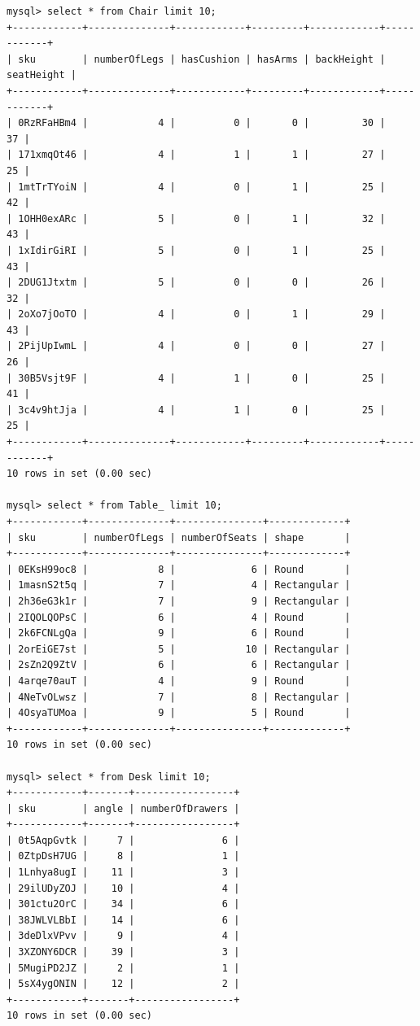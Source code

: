 \documentclass[american,extrafontsizes,12pt,portrait,letterpaper,oneside,onecolumn,final]{memoir}
\begin{document}
\begin{verbatim}
mysql> select * from Chair limit 10;
+------------+--------------+------------+---------+------------+------------+
| sku        | numberOfLegs | hasCushion | hasArms | backHeight | seatHeight |
+------------+--------------+------------+---------+------------+------------+
| 0RzRFaHBm4 |            4 |          0 |       0 |         30 |         37 |
| 171xmqOt46 |            4 |          1 |       1 |         27 |         25 |
| 1mtTrTYoiN |            4 |          0 |       1 |         25 |         42 |
| 1OHH0exARc |            5 |          0 |       1 |         32 |         43 |
| 1xIdirGiRI |            5 |          0 |       1 |         25 |         43 |
| 2DUG1Jtxtm |            5 |          0 |       0 |         26 |         32 |
| 2oXo7jOoTO |            4 |          0 |       1 |         29 |         43 |
| 2PijUpIwmL |            4 |          0 |       0 |         27 |         26 |
| 30B5Vsjt9F |            4 |          1 |       0 |         25 |         41 |
| 3c4v9htJja |            4 |          1 |       0 |         25 |         25 |
+------------+--------------+------------+---------+------------+------------+
10 rows in set (0.00 sec)

mysql> select * from Table_ limit 10;
+------------+--------------+---------------+-------------+
| sku        | numberOfLegs | numberOfSeats | shape       |
+------------+--------------+---------------+-------------+
| 0EKsH99oc8 |            8 |             6 | Round       |
| 1masnS2t5q |            7 |             4 | Rectangular |
| 2h36eG3k1r |            7 |             9 | Rectangular |
| 2IQOLQOPsC |            6 |             4 | Round       |
| 2k6FCNLgQa |            9 |             6 | Round       |
| 2orEiGE7st |            5 |            10 | Rectangular |
| 2sZn2Q9ZtV |            6 |             6 | Rectangular |
| 4arqe70auT |            4 |             9 | Round       |
| 4NeTvOLwsz |            7 |             8 | Rectangular |
| 4OsyaTUMoa |            9 |             5 | Round       |
+------------+--------------+---------------+-------------+
10 rows in set (0.00 sec)

mysql> select * from Desk limit 10;
+------------+-------+-----------------+
| sku        | angle | numberOfDrawers |
+------------+-------+-----------------+
| 0t5AqpGvtk |     7 |               6 |
| 0ZtpDsH7UG |     8 |               1 |
| 1Lnhya8ugI |    11 |               3 |
| 29ilUDyZOJ |    10 |               4 |
| 301ctu2OrC |    34 |               6 |
| 38JWLVLBbI |    14 |               6 |
| 3deDlxVPvv |     9 |               4 |
| 3XZONY6DCR |    39 |               3 |
| 5MugiPD2JZ |     2 |               1 |
| 5sX4ygONIN |    12 |               2 |
+------------+-------+-----------------+
10 rows in set (0.00 sec)


\end{verbatim}
\end{document}
